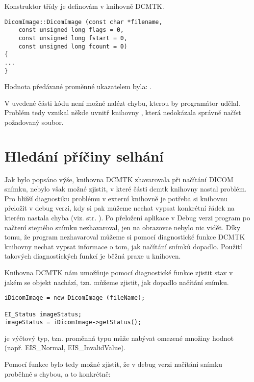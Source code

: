 Konstruktor třídy  je definovám v knihovně DCMTK.

\begin{lstlisting}[label={DicomImage},caption={Definice konstruktoru třídy \clist{DicomImage}.}]
DicomImage::DicomImage (const char *filename,
    const unsigned long flags = 0,
    const unsigned long fstart = 0,
    const unsigned long fcount = 0)
{
...
}
\end{lstlisting}

Hodnota předávané proměnné ukazatelem  byla: .

V uvedené části kódu není možné nalézt chybu, kterou by programátor udělal. Problém tedy vznikal někde uvnitř knihovny , která nedokázala správně načíst požadovaný soubor.

\section{Hledání příčiny selhání}
Jak bylo popsáno výše, knihovna DCMTK zhavarovala při načítání DICOM snímku, nebylo však možné zjistit, v které části dcmtk knihovny nastal problém. Pro bližší diagnostiku problému v externí knihovně je potřeba si knihovnu přeložit v debug verzi, kdy si pak můžeme nechat vypsat konkrétní řádek na kterém nastala chyba (viz. str. \pageref{releasedebug}).
Po přeložení aplikace v Debug verzi program po načtení stejného snímku nezhavaroval, jen na obrazovce nebylo nic vidět. Díky tomu, že program nezhavaroval můžeme si pomocí diagnostické funkce DCMTK knihovny nechat vypsat informace o tom, jak načítání snímků dopadlo. Použití takových diagnostických funkcí je běžná praxe u knihoven.

Knihovna DCMTK nám umožňuje pomocí diagnostické funkce  zjistit stav v jakém se objekt nachází, tzn. můžeme zjistit, jak dopadlo načítání snímku.

\begin{lstlisting}[caption={Funkce knihovny DCMTK pro zjištění chyby při načítání snímku.}]
iDicomImage = new DicomImage (fileName);

EI_Status imageStatus;
imageStatus = iDicomImage->getStatus();
\end{lstlisting}

 je výčtový typ, tzn. proměnná typu  může nabývat omezené množiny hodnot (např. EIS\_Normal, EIS\_InvalidValue).

Pomocí funkce  bylo tedy možné zjistit, že v debug verzi načítání snímku proběhně s chybou, a to konkrétně:

